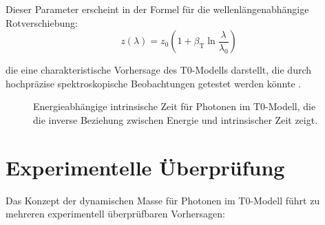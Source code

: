 \documentclass[12pt,a4paper]{article}
\newcommand{\betaT}{\beta_{\text{T}}}
\begin{document}
	Dieser Parameter erscheint in der Formel für die wellenlängenabhängige Rotverschiebung:
	\begin{equation}
		z(\lambda) = z_0 \left(1 + \betaT \ln\frac{\lambda}{\lambda_0}\right)
	\end{equation}
	
	die eine charakteristische Vorhersage des T0-Modells darstellt, die durch hochpräzise spektroskopische Beobachtungen getestet werden könnte \cite{pascher_messdifferenzen_2025}.
	
	\begin{figure}[h]
		\centering
		\caption{Energieabhängige intrinsische Zeit für Photonen im T0-Modell, die die inverse Beziehung zwischen Energie und intrinsischer Zeit zeigt.}
		\label{fig:energy_time}
	\end{figure}
	
	\section{Experimentelle Überprüfung}
	Das Konzept der dynamischen Masse für Photonen im T0-Modell führt zu mehreren experimentell überprüfbaren Vorhersagen:
	
\end{document}
